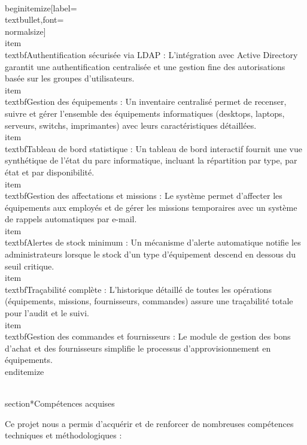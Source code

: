 \\begin{itemize}[label=\\textbullet,font=\\normalsize]
    \\item \\textbf{Authentification sécurisée via LDAP :} L'intégration avec Active Directory garantit une authentification centralisée et une gestion fine des autorisations basée sur les groupes d'utilisateurs.
    \\item \\textbf{Gestion des équipements :} Un inventaire centralisé permet de recenser, suivre et gérer l'ensemble des équipements informatiques (desktops, laptops, serveurs, switchs, imprimantes) avec leurs caractéristiques détaillées.
    \\item \\textbf{Tableau de bord statistique :} Un tableau de bord interactif fournit une vue synthétique de l'état du parc informatique, incluant la répartition par type, par état et par disponibilité.
    \\item \\textbf{Gestion des affectations et missions :} Le système permet d'affecter les équipements aux employés et de gérer les missions temporaires avec un système de rappels automatiques par e-mail.
    \\item \\textbf{Alertes de stock minimum :} Un mécanisme d'alerte automatique notifie les administrateurs lorsque le stock d'un type d'équipement descend en dessous du seuil critique.
    \\item \\textbf{Traçabilité complète :} L'historique détaillé de toutes les opérations (équipements, missions, fournisseurs, commandes) assure une traçabilité totale pour l'audit et le suivi.
    \\item \\textbf{Gestion des commandes et fournisseurs :} Le module de gestion des bons d'achat et des fournisseurs simplifie le processus d'approvisionnement en équipements.
\\end{itemize}

\\section*{Compétences acquises}

Ce projet nous a permis d'acquérir et de renforcer de nombreuses compétences techniques et méthodologiques :

